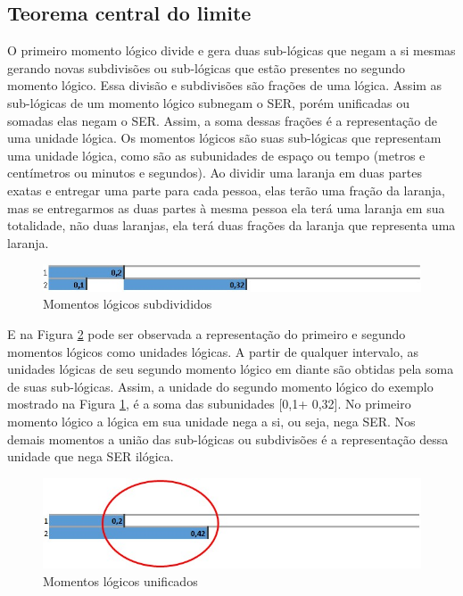 \subsection{Teorema central do limite}

O primeiro momento lógico divide e gera duas sub-lógicas que negam a si mesmas gerando novas subdivisões ou sub-lógicas que estão presentes no segundo momento lógico. Essa divisão e subdivisões são frações de uma lógica.  Assim as sub-lógicas de um momento lógico subnegam o SER, porém unificadas ou somadas elas negam o SER. Assim, a soma dessas frações é a representação de uma unidade lógica. Os momentos lógicos são suas sub-lógicas que representam uma unidade lógica, como são as subunidades de espaço ou tempo (metros e centímetros ou minutos e segundos).  Ao dividir uma laranja em duas partes exatas e entregar uma parte para cada pessoa, elas terão uma fração da laranja, mas se entregarmos as duas partes à mesma pessoa ela terá uma laranja em sua totalidade, não duas laranjas, ela terá duas frações da laranja que representa uma laranja.

\begin{figure}[H]
\caption{Momentos lógicos subdivididos}
\label{fig:second_logical_moment}
\centering
\includegraphics[scale=.85]{sections/images/second_logical_moment.jpg}
\end{figure}

E na Figura \ref{fig:logical_units} pode ser observada a representação do primeiro e segundo momentos lógicos como unidades lógicas. A partir de qualquer intervalo, as unidades lógicas de seu segundo momento lógico em diante são obtidas pela soma de suas sub-lógicas. Assim, a unidade do segundo momento lógico do exemplo mostrado na Figura \ref{fig:second_logical_moment}, é a soma das subunidades [0,1+ 0,32]. No primeiro momento lógico a lógica em sua unidade nega a si, ou seja, nega SER. Nos demais momentos a união das sub-lógicas ou subdivisões é a representação dessa unidade que nega SER ilógica.

\begin{figure}[H]
\caption{Momentos lógicos unificados}
\label{fig:logical_units}
\centering
\includegraphics[scale=.85]{sections/images/logical_units.jpg}
\end{figure}

